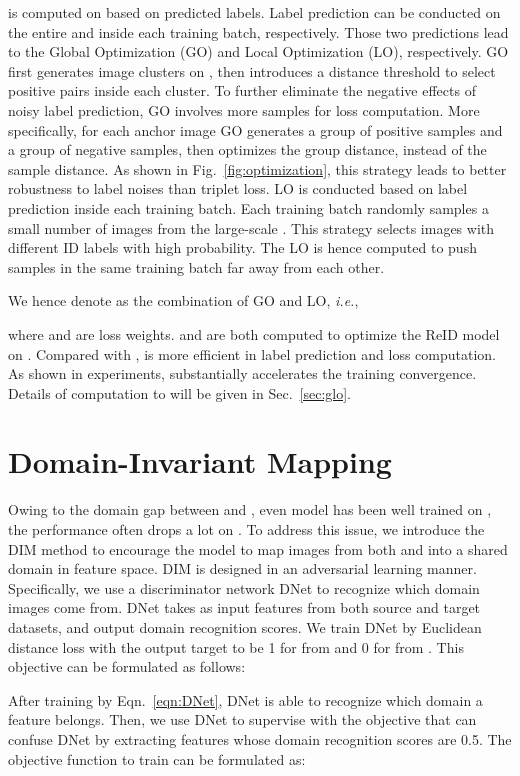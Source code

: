 \documentclass[sigconf]{acmart}
\begin{document}
 is computed on  based on predicted labels. Label prediction can be conducted on the entire  and inside each training batch, respectively. Those two predictions lead to the Global Optimization (GO) and Local Optimization (LO), respectively. GO first generates image clusters on , then introduces a distance threshold to select positive pairs inside each cluster. To further eliminate the negative effects of noisy label prediction, GO involves more samples for loss computation. More specifically, for each anchor image GO generates a group of positive samples and a group of negative samples, then optimizes the group distance, instead of the sample distance. As shown in Fig.~\ref{fig:optimization}, this strategy leads to better robustness to label noises than triplet loss. LO is conducted based on label prediction inside each training batch. Each training batch randomly samples a small number of images from the large-scale . This strategy selects images with different ID labels with high probability. The LO is hence computed to push samples in the same training batch far away from each other.

We hence denote  as the combination of GO and LO, \emph{i.e.}, 

where  and  are loss weights.  and  are both computed to optimize the ReID model on . Compared with ,  is more efficient in label prediction and loss computation. As shown in experiments,  substantially accelerates the training convergence. Details of computation to  will be given in Sec.~\ref{sec:glo}.


\section{Domain-Invariant Mapping}
\label{sec:dim}

Owing to the domain gap between  and , even model has been well trained on , the performance often drops a lot on . To address this issue, we introduce the DIM method to encourage the model to map images from both  and  into a shared domain in feature space. DIM is designed in an adversarial learning manner. Specifically, we use a discriminator network DNet to recognize which domain images come from. DNet takes as input features from both source and target datasets, and output domain recognition scores. We train DNet by Euclidean distance loss with the output target to be 1 for  from  and 0 for  from . This objective can be formulated as follows:

After training by Eqn.~\eqref{eqn:DNet}, DNet is able to recognize which domain a feature belongs. Then, we use DNet to supervise  with the objective that  can confuse DNet by extracting features whose domain recognition scores are 0.5. The objective function to train  can be formulated as:
\end{document}
